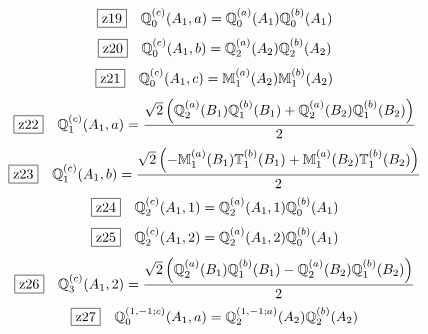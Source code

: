 \documentclass[fleqn,10pt,landscape]{jsarticle}
\begin{document}
\begin{dmath*}
\hspace*{3mm}\fbox{z19}\quad \mathbb{Q}_{0}^{(c)}(A_{1},a)=\mathbb{Q}_{0}^{(a)}(A_{1}) \mathbb{Q}_{0}^{(b)}(A_{1})
\end{dmath*}
\begin{dmath*}
\hspace*{3mm}\fbox{z20}\quad \mathbb{Q}_{0}^{(c)}(A_{1},b)=\mathbb{Q}_{2}^{(a)}(A_{2}) \mathbb{Q}_{2}^{(b)}(A_{2})
\end{dmath*}
\begin{dmath*}
\hspace*{3mm}\fbox{z21}\quad \mathbb{Q}_{0}^{(c)}(A_{1},c)=\mathbb{M}_{1}^{(a)}(A_{2}) \mathbb{M}_{1}^{(b)}(A_{2})
\end{dmath*}
\begin{dmath*}
\hspace*{3mm}\fbox{z22}\quad \mathbb{Q}_{1}^{(c)}(A_{1},a)=\frac{\sqrt{2} \left(\mathbb{Q}_{2}^{(a)}(B_{1}) \mathbb{Q}_{1}^{(b)}(B_{1}) + \mathbb{Q}_{2}^{(a)}(B_{2}) \mathbb{Q}_{1}^{(b)}(B_{2})\right)}{2}
\end{dmath*}
\begin{dmath*}
\hspace*{3mm}\fbox{z23}\quad \mathbb{Q}_{1}^{(c)}(A_{1},b)=\frac{\sqrt{2} \left(- \mathbb{M}_{1}^{(a)}(B_{1}) \mathbb{T}_{1}^{(b)}(B_{1}) + \mathbb{M}_{1}^{(a)}(B_{2}) \mathbb{T}_{1}^{(b)}(B_{2})\right)}{2}
\end{dmath*}
\begin{dmath*}
\hspace*{3mm}\fbox{z24}\quad \mathbb{Q}_{2}^{(c)}(A_{1},1)=\mathbb{Q}_{2}^{(a)}(A_{1},1) \mathbb{Q}_{0}^{(b)}(A_{1})
\end{dmath*}
\begin{dmath*}
\hspace*{3mm}\fbox{z25}\quad \mathbb{Q}_{2}^{(c)}(A_{1},2)=\mathbb{Q}_{2}^{(a)}(A_{1},2) \mathbb{Q}_{0}^{(b)}(A_{1})
\end{dmath*}
\begin{dmath*}
\hspace*{3mm}\fbox{z26}\quad \mathbb{Q}_{3}^{(c)}(A_{1},2)=\frac{\sqrt{2} \left(\mathbb{Q}_{2}^{(a)}(B_{1}) \mathbb{Q}_{1}^{(b)}(B_{1}) - \mathbb{Q}_{2}^{(a)}(B_{2}) \mathbb{Q}_{1}^{(b)}(B_{2})\right)}{2}
\end{dmath*}
\begin{dmath*}
\hspace*{3mm}\fbox{z27}\quad \mathbb{Q}_{0}^{(1,-1;c)}(A_{1},a)=\mathbb{Q}_{2}^{(1,-1;a)}(A_{2}) \mathbb{Q}_{2}^{(b)}(A_{2})
\end{dmath*}
\end{document}
